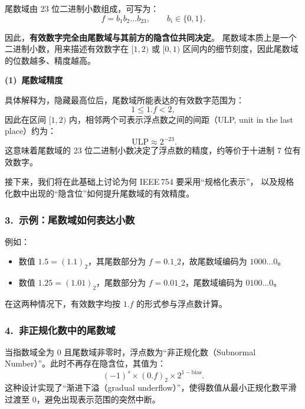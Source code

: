 尾数域由 23 位二进制小数组成，可写为：
\[
f = b_1 b_2 \ldots b_{23}, \qquad b_i\in\{0,1\}.
\]


因此，\textbf{有效数字完全由尾数域与其前方的隐含位共同决定}。
尾数域本质上是一个二进制小数，用来描述有效数字在 $[1,2)$ 或 
$[0,1)$ 区间内的细节刻度，因此尾数域的位数越多、精度越高。

\vspace{1em}
\noindent\textbf{(1)~尾数域精度}\par\vspace{0.5em}

具体解释为，隐藏最高位后，尾数域所能表达的有效数字范围为：
\[
1 \le 1.f < 2,
\]
因此在区间 $[1,2)$ 内，相邻两个可表示浮点数之间的间距（ULP, unit in the last place）约为：
\[\
\mathrm{ULP} \approx 2^{-23}.
\]
这意味着尾数域的 23 位二进制小数决定了浮点数的精度，约等价于十进制 $7$ 位有效数字。






接下来，我们将在此基础上讨论为何 IEEE\,754 要采用“规格化表示”，
以及规格化数中出现的“隐含位”如何提升尾数域的有效精度。

\newpage


















\subsubsection*{3.\ 示例：尾数域如何表达小数}
例如：
\begin{itemize}
    \item 数值 $1.5 = (1.1)_2$，其尾数部分为 $f = 0.1\_2$，故尾数域编码为 $1000\ldots 0$。
    \item 数值 $1.25 = (1.01)_2$，尾数部分为 $f = 0.01\_2$，尾数域编码为 $0100\ldots 0$。
\end{itemize}
在这两种情况下，有效数字均按 $1.f$ 的形式参与浮点数计算。

\subsubsection*{4.\ 非正规化数中的尾数域}
当指数域全为 $0$ 且尾数域非零时，浮点数为“非正规化数（Subnormal Number）”。此时不再存在隐含位，其值为：
\[
(-1)^s \times (0.f)_2 \times 2^{1-\mathrm{bias}}.
\]
这种设计实现了“渐进下溢（gradual underflow）”，使得数值从最小正规化数平滑过渡至 $0$，避免出现表示范围的突然中断。





